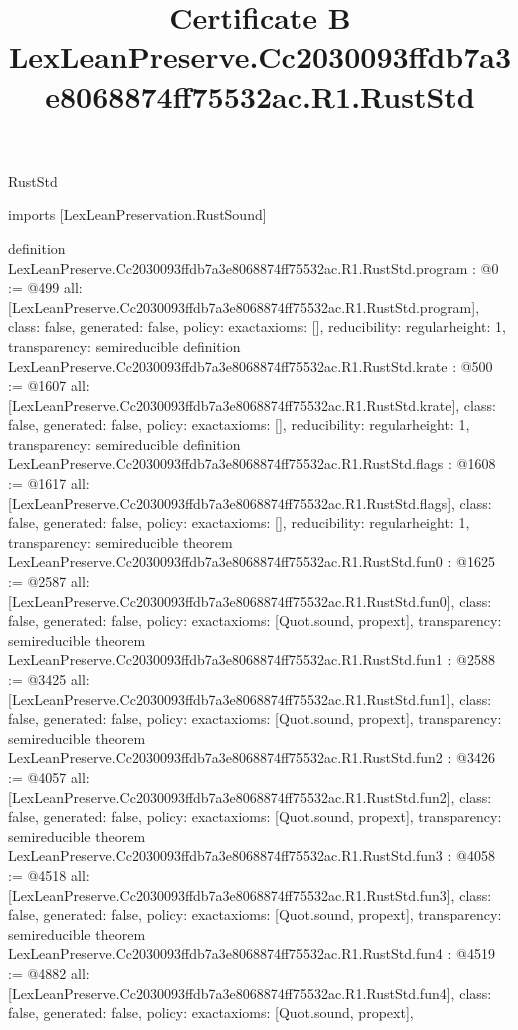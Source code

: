\begin{lexlean}{RustStd}
\title{Certificate B LexLeanPreserve.Cc2030093ffdb7a3e8068874ff75532ac.R1.RustStd}
\begin{coremodule}
imports [LexLeanPreservation.RustSound]

definition LexLeanPreserve.Cc2030093ffdb7a3e8068874ff75532ac.R1.RustStd.program : @0 := @499 {
  all: [LexLeanPreserve.Cc2030093ffdb7a3e8068874ff75532ac.R1.RustStd.program],
  class: false,
  generated: false,
  policy: exact{axioms: []},
  reducibility: regular{height: 1},
  transparency: semireducible
}
definition LexLeanPreserve.Cc2030093ffdb7a3e8068874ff75532ac.R1.RustStd.krate : @500 := @1607 {
  all: [LexLeanPreserve.Cc2030093ffdb7a3e8068874ff75532ac.R1.RustStd.krate],
  class: false,
  generated: false,
  policy: exact{axioms: []},
  reducibility: regular{height: 1},
  transparency: semireducible
}
definition LexLeanPreserve.Cc2030093ffdb7a3e8068874ff75532ac.R1.RustStd.flags : @1608 := @1617 {
  all: [LexLeanPreserve.Cc2030093ffdb7a3e8068874ff75532ac.R1.RustStd.flags],
  class: false,
  generated: false,
  policy: exact{axioms: []},
  reducibility: regular{height: 1},
  transparency: semireducible
}
theorem LexLeanPreserve.Cc2030093ffdb7a3e8068874ff75532ac.R1.RustStd.fun0 : @1625 := @2587 {
  all: [LexLeanPreserve.Cc2030093ffdb7a3e8068874ff75532ac.R1.RustStd.fun0],
  class: false,
  generated: false,
  policy: exact{axioms: [Quot.sound, propext]},
  transparency: semireducible
}
theorem LexLeanPreserve.Cc2030093ffdb7a3e8068874ff75532ac.R1.RustStd.fun1 : @2588 := @3425 {
  all: [LexLeanPreserve.Cc2030093ffdb7a3e8068874ff75532ac.R1.RustStd.fun1],
  class: false,
  generated: false,
  policy: exact{axioms: [Quot.sound, propext]},
  transparency: semireducible
}
theorem LexLeanPreserve.Cc2030093ffdb7a3e8068874ff75532ac.R1.RustStd.fun2 : @3426 := @4057 {
  all: [LexLeanPreserve.Cc2030093ffdb7a3e8068874ff75532ac.R1.RustStd.fun2],
  class: false,
  generated: false,
  policy: exact{axioms: [Quot.sound, propext]},
  transparency: semireducible
}
theorem LexLeanPreserve.Cc2030093ffdb7a3e8068874ff75532ac.R1.RustStd.fun3 : @4058 := @4518 {
  all: [LexLeanPreserve.Cc2030093ffdb7a3e8068874ff75532ac.R1.RustStd.fun3],
  class: false,
  generated: false,
  policy: exact{axioms: [Quot.sound, propext]},
  transparency: semireducible
}
theorem LexLeanPreserve.Cc2030093ffdb7a3e8068874ff75532ac.R1.RustStd.fun4 : @4519 := @4882 {
  all: [LexLeanPreserve.Cc2030093ffdb7a3e8068874ff75532ac.R1.RustStd.fun4],
  class: false,
  generated: false,
  policy: exact{axioms: [Quot.sound, propext]},
}
\end{coremodule}
\end{lexlean}
